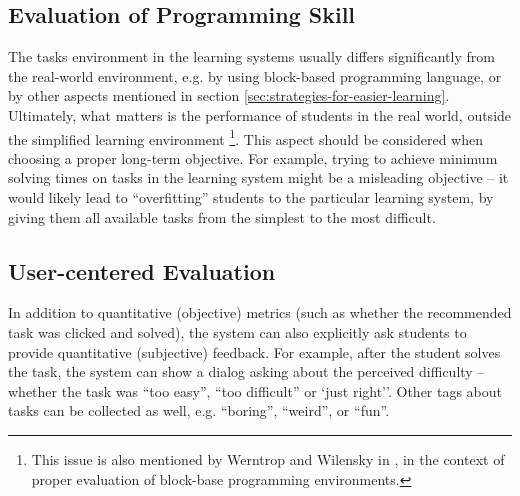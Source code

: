 
\subsection{Evaluation of Programming Skill}


The tasks environment in the learning systems usually differs significantly
  from the real-world environment,
  e.g. by using block-based programming language,
  or by other aspects mentioned in section \ref{sec:strategies-for-easier-learning}.
Ultimately, what matters is the performance of students in the real world,
  outside the simplified learning environment%
\footnote{%
  This issue is also mentioned by Werntrop and Wilensky %
  in \cite{challenges-of-blocks-based-environments}, %
  in the context of proper evaluation of block-base programming environments.}.
This aspect should be considered when choosing a proper long-term objective.
For example, trying to achieve minimum solving times on tasks in the learning system
  might be a misleading objective
  -- it would likely lead to ``overfitting'' students to the particular learning system,
  by giving them all available tasks from the simplest to the most difficult.


\subsection{User-centered Evaluation}

In addition to quantitative (objective) metrics (such as whether the
recommended task was clicked and solved), the system can also explicitly ask
students to provide quantitative (subjective) feedback.
For example, after the student solves the task, the system can show a dialog
asking about the perceived difficulty -- whether the task was ``too
easy'', ``too difficult'' or `just right''.
Other tags about tasks can be collected as well, e.g. ``boring'', ``weird'', or ``fun''.

